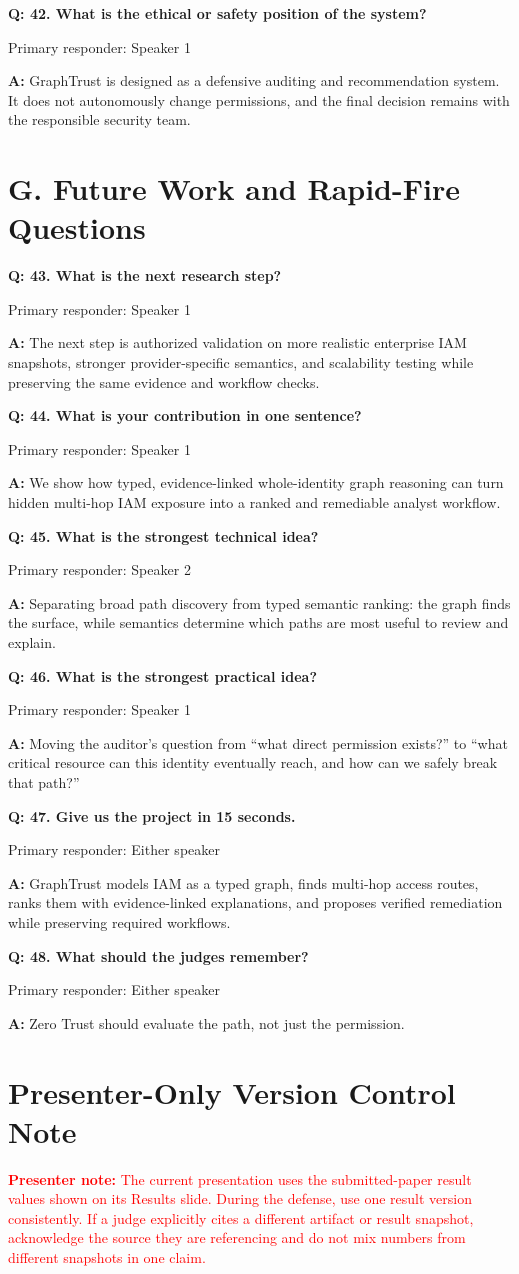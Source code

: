 \documentclass[11pt,a4paper]{article}
\newcommand{\q}[1]{\vspace{0.35em}\textbf{Q: #1}\par}
\newcommand{\a}[1]{\textbf{A:} #1\par}
\newcommand{\owner}[1]{\textcolor{Muted}{\small Primary responder: #1}\par}
\newcommand{\danger}[1]{\textcolor{Red}{\textbf{Presenter note:} #1}\par}
\begin{document}
\q{42. What is the ethical or safety position of the system?}
\owner{Speaker 1}
\a{GraphTrust is designed as a defensive auditing and recommendation system. It does not autonomously change permissions, and the final decision remains with the responsible security team.}

\section*{G. Future Work and Rapid-Fire Questions}

\q{43. What is the next research step?}
\owner{Speaker 1}
\a{The next step is authorized validation on more realistic enterprise IAM snapshots, stronger provider-specific semantics, and scalability testing while preserving the same evidence and workflow checks.}

\q{44. What is your contribution in one sentence?}
\owner{Speaker 1}
\a{We show how typed, evidence-linked whole-identity graph reasoning can turn hidden multi-hop IAM exposure into a ranked and remediable analyst workflow.}

\q{45. What is the strongest technical idea?}
\owner{Speaker 2}
\a{Separating broad path discovery from typed semantic ranking: the graph finds the surface, while semantics determine which paths are most useful to review and explain.}

\q{46. What is the strongest practical idea?}
\owner{Speaker 1}
\a{Moving the auditor's question from ``what direct permission exists?'' to ``what critical resource can this identity eventually reach, and how can we safely break that path?''}

\q{47. Give us the project in 15 seconds.}
\owner{Either speaker}
\a{GraphTrust models IAM as a typed graph, finds multi-hop access routes, ranks them with evidence-linked explanations, and proposes verified remediation while preserving required workflows.}

\q{48. What should the judges remember?}
\owner{Either speaker}
\a{Zero Trust should evaluate the path, not just the permission.}

\section*{Presenter-Only Version Control Note}

\danger{The current presentation uses the submitted-paper result values shown on its Results slide. During the defense, use one result version consistently. If a judge explicitly cites a different artifact or result snapshot, acknowledge the source they are referencing and do not mix numbers from different snapshots in one claim.}
\end{document}
